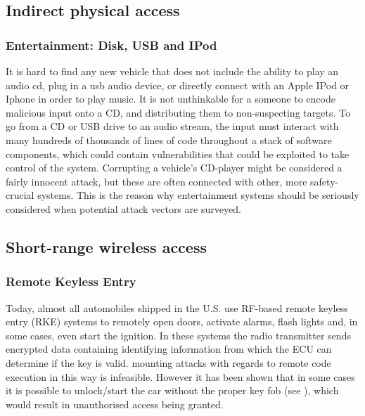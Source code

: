 \subsection{Indirect physical access}
\label{subsec:indirect_physical_access}

\subsubsection{Entertainment: Disk, USB and IPod} 
\label{subsubsec:entertainment}
It is hard to find any new vehicle that does not include the ability to play an audio cd, plug in a usb audio device, or directly connect with an Apple IPod or Iphone in order to play music. It is not unthinkable for a someone to encode malicious input onto a CD, and distributing them to non-suspecting targets. To go from a CD or USB drive to an audio stream, the input must interact with many hundreds of thousands of lines of code throughout a stack of software components, which could contain vulnerabilities that could be exploited to take control of the system\cite{Pike15}. Corrupting a vehicle's CD-player might be considered a fairly innocent attack, but these are often connected with other, more safety-crucial systems. This is the reason why entertainment systems should be seriously considered when potential attack vectors are surveyed.

\subsection{Short-range wireless access}
\label{subsec:short-range_wireless_access}

\subsubsection{Remote Keyless Entry}
\label{subsubsec:rke}

Today, almost all automobiles shipped in the U.S. use RF-based remote keyless entry (RKE) systems to remotely open doors, activate alarms, flash lights and, in some cases, even start the ignition\cite{Kosher}. In these systems the radio transmitter sends encrypted data containing identifying information from which the ECU can determine if the key is valid\cite{MillerA}. mounting attacks with regards to remote code execution in this way is infeasible. However it has been shown that in some cases it is possible to unlock/start the car without the proper key fob (see \cite{KeeLoq}), which would result in unauthorised access being granted.

